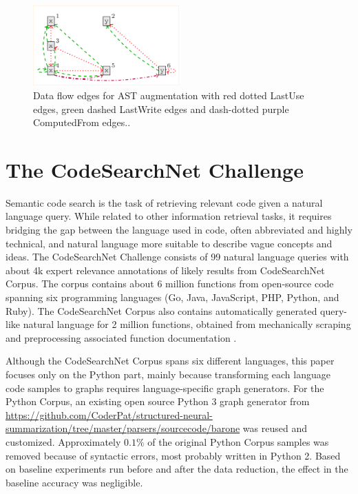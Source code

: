 \documentclass{article}
\begin{document}
\begin{figure}[h]
\includegraphics[width=0.5\textwidth,trim=4 4 4 4,clip]{data_flow.png}
 \centering
\caption{\label{fig:flow}Data flow edges for AST augmentation with red dotted LastUse edges, green dashed LastWrite edges and dash-dotted
purple ComputedFrom edges.\cite{1711.00740}.}
\end{figure}

\section{The CodeSearchNet Challenge}

Semantic code search is the task of retrieving relevant code given a natural language query. While related to other information retrieval tasks, it requires bridging the gap between the language used in code, often abbreviated and highly technical, and natural language more suitable to describe vague concepts and ideas.
The CodeSearchNet Challenge consists of 99 natural language queries with about 4k expert relevance annotations of likely results from CodeSearchNet Corpus. The corpus contains about 6 million functions from open-source code spanning six programming languages (Go, Java, JavaScript, PHP, Python, and Ruby). The CodeSearchNet Corpus also contains automatically generated query-like natural language for 2 million functions, obtained from mechanically scraping and preprocessing associated function documentation \cite{1909.09436}. 

Although the CodeSearchNet Corpus spans six different languages, this paper focuses only on the Python part, mainly because transforming each language code samples to graphs requires language-specific graph generators. For the Python Corpus, an existing open source Python 3 graph generator from \url{https://github.com/CoderPat/structured-neural-summarization/tree/master/parsers/sourcecode/barone} \cite{1811.01824} was reused and customized. Approximately $0.1\%$ of the original Python Corpus samples was removed because of syntactic errors, most probably written in Python 2. Based on baseline experiments run before and after the data reduction, the effect in the baseline accuracy was negligible.
\end{document}
